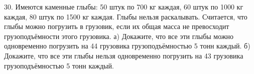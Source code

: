 30. Имеются каменные глыбы: 50 штук по 700 кг каждая, 60 штук по 1000 кг каждая, 80 штук по 1500 кг каждая. Глыбы нельзя раскалывать. Считается, что глыбы можно погрузить в грузовик, если их общая масса не превосходит грузоподъёмности этого грузовика. а) Докажите, что все эти глыбы можно одновременно погрузить на 44 грузовика грузоподъёмностью 5 тонн каждый. б) Докажите, что все эти глыбы нельзя одновременно погрузить на 43 грузовика грузоподъёмностью 5 тонн каждый.\\
